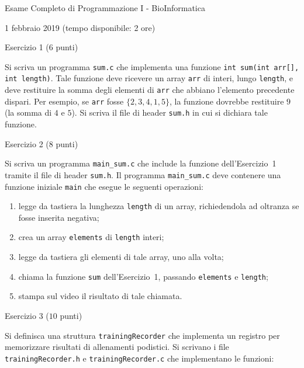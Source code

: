 \documentclass[12pt]{article}
\begin{document}
\begin{center}{\LARGE Esame Completo di Programmazione I - BioInformatica}\\
\vspace*{-2ex}
\begin{center}
  \large 1 febbraio 2019 (tempo disponibile: 2 ore)
\end{center}
\end{center}

\vspace*{1ex}
\begin{center}{\Large Esercizio 1} ($6$ punti)
\end{center}
Si scriva un programma \texttt{sum.c} che implementa una funzione \texttt{int sum(int arr[], int length)}. Tale funzione deve ricevere un array \texttt{arr} di interi, lungo \texttt{length}, e deve restituire la somma degli elementi di \texttt{arr} che abbiano l'elemento precedente dispari. Per esempio, se \texttt{arr} fosse $\{2,3,4,1,5\}$, la funzione dovrebbe restituire $9$ (la somma di $4$ e $5$). Si scriva il file di header \texttt{sum.h} in cui si dichiara tale funzione.

\vspace*{1ex}
\begin{center}{\Large Esercizio 2} ($8$ punti)\end{center}
%
Si scriva un programma \texttt{main\_sum.c} che include la funzione dell'Esercizio~1 tramite
il file di header \texttt{sum.h}.
Il programma \texttt{main\_sum.c} deve contenere una funzione iniziale \texttt{main} che esegue
le seguenti operazioni:
\begin{enumerate}
\item legge da tastiera la lunghezza \texttt{length} di un array, richiedendola ad oltranza se fosse inserita negativa;
\item crea un array \texttt{elements} di \texttt{length} interi;
\item legge da tastiera gli elementi di tale array, uno alla volta;
\item chiama la funzione \texttt{sum} dell'Esercizio~1, passando \texttt{elements} e \texttt{length};
\item stampa sul video il risultato di tale chiamata.
\end{enumerate}

\vspace*{1ex}
\begin{center}{\Large Esercizio 3} ($10$ punti)\end{center}
%
Si definisca una struttura \texttt{trainingRecorder} che implementa un registro per memorizzare risultati di allenamenti podistici. Si scrivano i file \texttt{trainingRecorder.h} e \texttt{trainingRecorder.c} che implementano le funzioni:
\end{document}
